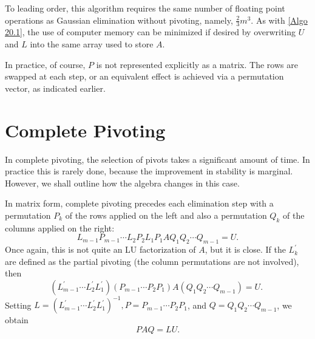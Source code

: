 To leading order, this algorithm requires the same number of floating point operations as Gaussian elimination without pivoting, namely, $\frac{2}{3} m^3$. As with \autoref{Algo 20.1}, the use of computer memory can be minimized if desired by overwriting $U$ and $L$ into the same array used to store $A$.

In practice, of course, $P$ is not represented explicitly as a matrix. The rows are swapped at each step, or an equivalent effect is achieved via a permutation vector, as indicated earlier.

\section{Complete Pivoting}
In complete pivoting, the selection of pivots takes a significant amount of time. In practice this is rarely done, because the improvement in stability is marginal. However, we shall outline how the algebra changes in this case.

In matrix form, complete pivoting precedes each elimination step with a permutation $P_k$ of the rows applied on the left and also a permutation $Q_k$ of the columns applied on the right:
$$
L_{m-1} P_{m-1} \cdots L_2 P_2 L_1 P_1 A Q_1 Q_2 \cdots Q_{m-1}=U .
$$
Once again, this is not quite an LU factorization of $A$, but it is close. If the $L_k^{\prime}$ are defined as the partial pivoting (the column permutations are not involved), then
$$
\left(L_{m-1}^{\prime} \cdots L_2^{\prime} L_1^{\prime}\right)\left(P_{m-1} \cdots P_2 P_1\right) A\left(Q_1 Q_2 \cdots Q_{m-1}\right)=U \text {. }
$$
Setting $L=\left(L_{m-1}^{\prime} \cdots L_2^{\prime} L_1^{\prime}\right)^{-1}, P=P_{m-1} \cdots P_2 P_1$, and $Q=Q_1 Q_2 \cdots Q_{m-1}$, we obtain
$$
P A Q=L U.
$$
